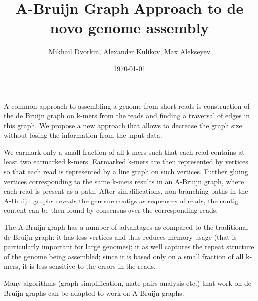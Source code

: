 \documentclass[12pt]{article}
\begin{document}
\author{Mikhail Dvorkin, Alexander Kulikov, Max Alekseyev}
\title{A-Bruijn Graph Approach to de novo genome assembly}
\date{\today}
\maketitle

A common approach to assembling a genome from short reads is construction of
the de Bruijn graph on k-mers from the reads and finding a traversal of edges
in this graph. We propose a new approach that allows to decrease
the graph size without losing the information from the input data.

We earmark only a small fraction of all k-mers such that each read contains
at least two earmarked k-mers. Earmarked k-mers are then represented by
vertices so that each read is represented by a line graph on such vertices.
Further gluing vertices corresponding to the same k-mers results in
an A-Bruijn graph, where each read is present as a path.
After simplifications, non-branching paths in the A-Bruijn graphs reveals
the genome contigs as sequences of reads; the contig content can be then
found by consensus over the corresponding reads.

The A-Bruijn graph has a number of advantages as compared to the traditional
de Bruijn graph: it has less vertices and thus reduces memory usage
(that is particularly important for large genomes); it as well captures
the repeat structure of the genome being assembled; since it is based only
on a small fraction of all k-mers, it is less sensitive to the errors
in the reads.

Many algorithms (graph simplification, mate pairs analysis etc.) that work on
de Bruijn graphs can be adapted to work on A-Bruijn graphs.
\end{document}
